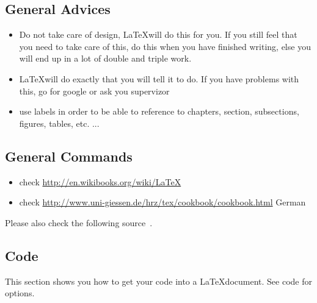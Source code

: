 \subsection*{General Advices}
\begin{itemize}
\item Do not take care of design, \LaTeX will do this for you. If you still feel that you need to take care of this, do this when you have finished writing, else you will end up in a lot of double and triple work.
\item \LaTeX will do exactly that you will tell it to do. If you have problems with this, go for google or ask you supervizor
\item use labels in order to be able to reference to chapters, section, subsections, figures, tables, etc. ...
\end{itemize}

\subsection*{General Commands}
\begin{itemize}
\item check \url{http://en.wikibooks.org/wiki/LaTeX}
\item check \url{http://www.uni-giessen.de/hrz/tex/cookbook/cookbook.html} German
\end{itemize}
Please also check the following source~\cite{latexcookbook2007}.

\newpage
\subsection*{Code}
This section shows you how to get your code into a \LaTeX document. See code for options.



